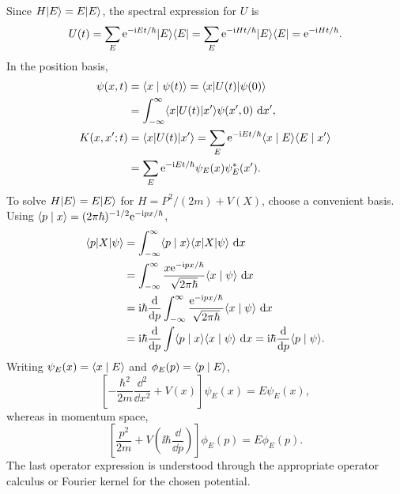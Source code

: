 Since $H\lvert E\rangle=E\lvert E\rangle$, the spectral expression for $U$ is
\[
 U(t)=\sum_E\mathrm{e}^{-\mathrm{i} Et/\hbar}\lvert E\rangle\langle E\rvert
 =\sum_E\mathrm{e}^{-\mathrm{i} Ht/\hbar}\lvert E\rangle\langle E\rvert
 =\mathrm{e}^{-\mathrm{i} Ht/\hbar}.
\]
In the position basis,
\begin{align*}
 \psi(x,t)&=\langle x\mid \psi(t)\rangle=\langle x\rvert U(t)\lvert \psi(0)\rangle\\
 &=\int_{-\infty}^{\infty}\langle x\rvert U(t)\lvert x'\rangle\psi(x',0)\,\mathop{}\!\mathrm{d} x',\\
 K(x,x';t)&=\langle x\rvert U(t)\lvert x'\rangle
 =\sum_E\mathrm{e}^{-\mathrm{i} Et/\hbar}\langle x\mid E\rangle\langle E\mid x'\rangle\\
 &=\sum_E\mathrm{e}^{-\mathrm{i} Et/\hbar}\psi_E(x)\psi_E^*(x').
\end{align*}
To solve $H\lvert E\rangle=E\lvert E\rangle$ for $H=P^2/(2m)+V(X)$, choose a convenient basis.
Using $\langle p\mid x\rangle=(2\pi\hbar)^{-1/2}\mathrm{e}^{-\mathrm{i} px/\hbar}$,
\begin{align*}
 \mel pX\psi
 &=\int_{-\infty}^{\infty}\braket px\mel xX\psi\,\dd x\\
 &=\int_{-\infty}^{\infty}\frac{x\ee^{-\ii px/\hbar}}{\sqrt{2\pi\hbar}}
       \braket x\psi\,\dd x\\
 &=\ii\hbar\frac{\dd}{\dd p}\int_{-\infty}^{\infty}
       \frac{\ee^{-\ii px/\hbar}}{\sqrt{2\pi\hbar}}\braket x\psi\,\dd x\\
 &=\ii\hbar\frac{\dd}{\dd p}\int\braket px\braket x\psi\,\dd x
 =\ii\hbar\frac{\dd}{\dd p}\braket p\psi.
\end{align*}
Writing $\psi_E(x)=\langle x\mid E\rangle$ and $\phi_E(p)=\langle p\mid E\rangle$,
\[
 \left[-\frac{\hbar^2}{2m}\frac{\dd^2}{\dd x^2}+V(x)\right]\psi_E(x)
 =E\psi_E(x),
\]
whereas in momentum space,
\[
 \left[\frac{p^2}{2m}+V\!\left(\ii\hbar\frac{\dd}{\dd p}\right)\right]\phi_E(p)
 =E\phi_E(p).
\]
The last operator expression is understood through the appropriate
operator calculus or Fourier kernel for the chosen potential.
